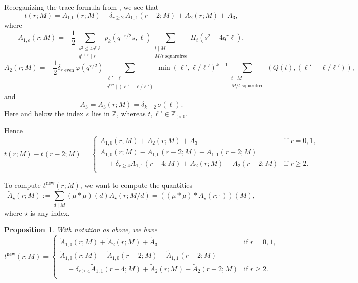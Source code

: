 \documentclass[11pt]{amsart}
\newcommand{\Z}{\mathbb Z}
\renewcommand{\phi}{\varphi}
\newcommand{\eps}{\varepsilon}
\newcommand{\new}{\mathrm{new}}
\newcommand{\bigdot}{\boldsymbol{\cdot}}
\numberwithin{lem}{section}
\newtheorem{prop}[lem]{Proposition}
\theoremstyle{remark}
\theoremstyle{definition}
\numberwithin{equation}{section}
\begin{document}
Reorganizing the trace formula from \cite[(2.7)]{SZ}, we see that
\begin{equation}
t(r; M) = A_{1,0}(r; M) - \delta_{r \ge 2} \, A_{1,1}(r-2; M) + A_2(r; M) + A_3,
\end{equation}
where
\[ A_{1,\eps}(r;M) = -\frac 12 \sum_{\substack{s^2 \le 4 q^r  \ell \\ q^{r+\eps} \mid s}} p_k(q^{-r/2} s, \ell) \sum_{\substack{t \mid M \\ M/t \text{ squarefree}}}  H_t(s^2 - 4 q^r \ell ), \]
\[ A_2(r; M) = - \frac 12 \delta_{r \text{ even}} \, \phi(q^{r/2}) \sum_{\substack{\ell' \mid \ell \\ q^{r/2} \mid (\ell' + \ell/\ell')}} \min (\ell', \ell/\ell')^{k-1} \sum_{\substack{t \mid M \\ M/t \text{ squarefree}}}
 (Q(t), (\ell' - \ell/\ell')),  \]
 and
 \[ A_3 = A_3(r; M) = \delta_{k = 2} \, \sigma(\ell). \]
 Here and below the index $s$ lies in $\Z$, whereas $t, \ell' \in \Z_{> 0}$.

Hence
\begin{equation*} t(r; M) - t(r-2; M) = 
\begin{cases}
A_{1,0}(r;M) + A_2(r; M) + A_3 & \text{if }r = 0, 1, \\
A_{1,0}(r;M) - A_{1,0}(r-2;M) - A_{1,1}(r-2;M) \\
\quad {} +  \delta_{r \ge 4} A_{1,1}(r-4;M)  + A_2(r;M) - A_2(r-2;M) & \text{if } r \ge 2. \\ 
\end{cases}
\end{equation*}

To compute $t^\new(r;M)$, we want to compute the quantities
\begin{equation} \tilde A_\star(r; M) := \sum_{d \mid M} (\mu * \mu)(d) A_\star(r;M/d) = ((\mu * \mu) * A_{\star}(r; \bigdot )) (M),
\end{equation}
where $\star$ is any index.

\begin{prop} With notation as above, we have
\begin{equation}
\label{eq:tnewcases}
 t^\new(r;M) =
\begin{cases}
\tilde A_{1,0}(r;M) +\tilde  A_2(r; M) + \tilde A_3 & \text{if } r = 0, 1, \\
\tilde A_{1,0}(r;M) - \tilde A_{1,0}(r-2;M) - \tilde A_{1,1}(r-2;M) \\
\quad {} + \delta_{r \ge 4} \tilde A_{1,1}(r-4;M) + \tilde A_2(r;M) - \tilde A_2(r-2;M) & \text{if } r \ge 2. \\ 
\end{cases}
\end{equation}
\end{prop}
\end{document}
